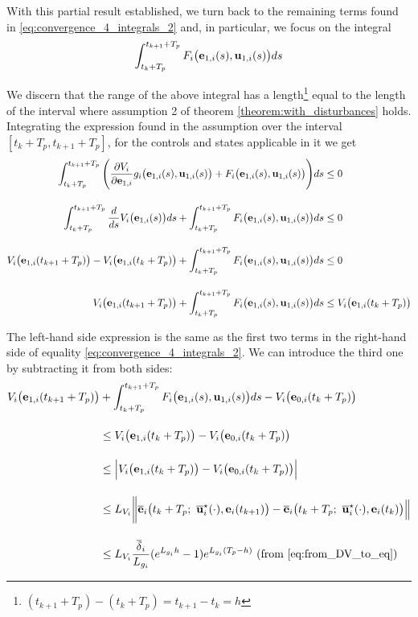 With this partial result established, we turn back to the remaining terms
found in \eqref{eq:convergence_4_integrals_2} and, in particular, we focus on
the integral
\begin{align}
  \int_{t_k + T_p}^{t_{k+1} + T_p} F_i \big(\bm{\mathbf{e}}_{1,i}(s), \bm{\mathbf{u}}_{1,i} (s)\big) d s
\end{align}
\begin{gg_box}
  We discern that the range of the above integral has a length\footnote{$(t_{k+1} + T_p) - (t_k + T_p) = t_{k+1} - t_k = h$}
  equal to the length of the interval where assumption 2 of theorem
  \eqref{theorem:with_disturbances} holds.
  Integrating the expression found in the assumption over the
  interval $[t_k + T_p, t_{k+1} + T_p]$, for the controls and states applicable
  in it we get
  \begin{align}
    \int_{t_k + T_p}^{t_{k+1} + T_p} \Bigg(\dfrac{\partial V_i}{\partial \bm{\mathbf{e}}_{1,i}} g_i\big(\bm{\mathbf{e}}_{1,i}(s), \bm{\mathbf{u}}_{1,i}(s)\big)
    + F_i\big(\bm{\mathbf{e}}_{1,i}(s), \bm{\mathbf{u}}_{1,i}(s)\big)\Bigg) ds &\leq 0 \\[2.5ex]
    \int_{t_k + T_p}^{t_{k+1} + T_p} \dfrac{d}{ds} V_i\big(\bm{\mathbf{e}}_{1,i}(s)\big) d s
    + \int_{t_k + T_p}^{t_{k+1} + T_p} F_i\big(\bm{\mathbf{e}}_{1,i}(s), \bm{\mathbf{u}}_{1,i}(s)\big) ds &\leq 0 \\[2.5ex]
    V_i\big(\bm{\mathbf{e}}_{1,i}(t_{k+1} + T_p)\big) - V_i\big(\bm{\mathbf{e}}_{1,i}(t_k + T_p)\big)
    + \int_{t_k + T_p}^{t_{k+1} + T_p} F_i\big(\bm{\mathbf{e}}_{1,i}(s), \bm{\mathbf{u}}_{1,i}(s)\big) ds &\leq 0 \\[2.5ex]
    V_i\big(\bm{\mathbf{e}}_{1,i}(t_{k+1} + T_p)\big)
    + \int_{t_k + T_p}^{t_{k+1} + T_p} F_i\big(\bm{\mathbf{e}}_{1,i}(s), \bm{\mathbf{u}}_{1,i}(s)\big) ds &\leq V_i\big(\bm{\mathbf{e}}_{1,i}(t_k + T_p)\big)
  \end{align}

  The left-hand side expression is the same as the first two terms in the
  right-hand side of equality \eqref{eq:convergence_4_integrals_2}. We can
  introduce the third one by subtracting it from both sides:
  \begin{align}
    V_i\big(\vect{e}_{1,i}(t_{k+1} + T_p)\big)
    &+ \int_{t_k + T_p}^{t_{k+1} + T_p} F_i\big(\vect{e}_{1,i}(s), \vect{u}_{1,i}(s)\big) ds
    - V_i\big(\vect{e}_{0,i}(t_k + T_p)\big) \\[2.5ex]
    &\leq V_i\big(\vect{e}_{1,i}(t_k + T_p)\big)
    - V_i\big(\vect{e}_{0,i}(t_k + T_p)\big) \\[2.5ex]
    &\leq \Big|V_i\big(\vect{e}_{1,i}(t_k + T_p)\big)
    - V_i\big(\vect{e}_{0,i}(t_k + T_p)\big)\Big| \\[2.5ex]
    &\leq L_{V_i}\bigg \|\overline{\vect{e}}_i\big(t_k + T_p;\ \overline{\vect{u}}_i^{\star}(\cdot), \vect{e}_i(t_{k+1})\big)
    - \overline{\vect{e}}_i\big(t_k + T_p;\ \overline{\vect{u}}_i^{\star}(\cdot), \vect{e}_i(t_k) \big)\Big\| \\[2.5ex]
    &\leq L_{V_i} \dfrac{\overline{\delta}_i}{L_{g_i}} (e^{L_{g_i}h} - 1) e^{L_{g_i} (T_p - h)} \text{ (from \eqref{eq:from_DV_to_eq})}
  \end{align}
\end{gg_box}
